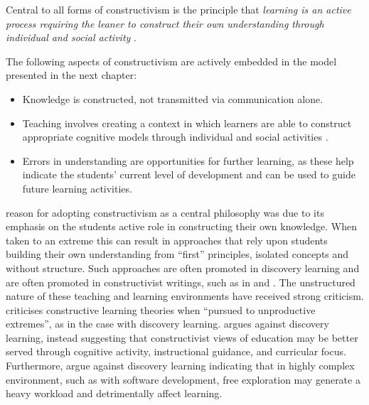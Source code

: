 Central to all forms of constructivism is the principle that \emph{learning is an active process requiring the leaner to construct their own understanding through individual and social activity} \cite{Biggs:1996c,Duffy:1996,Duffy:1992,Glasersfeld:1989,Steffe:1995}. 

%
%

The following aspects of constructivism are actively embedded in the model presented in the next chapter:
\begin{itemize}[noitemsep,nolistsep]
	\item Knowledge is constructed, not transmitted via communication alone.
	\item Teaching involves creating a context in which learners are able to construct appropriate cognitive models through individual and social activities \cite{Cobb:1994}.
	\item Errors in understanding are opportunities for further learning, as these help indicate the students' current level of development and can be used to guide future learning activities.
\end{itemize}

\citet{Biggs:1996c} reason for adopting constructivism as a central philosophy was due to its emphasis on the students active role in constructing their own knowledge. When taken to an extreme this can result in approaches that rely upon students building their own understanding from ``first'' principles, isolated concepts and without structure. Such approaches are often promoted in discovery learning \cite{Bruner:1961} and are often promoted in constructivist writings, such as in \citet{Glasersfeld:1989} and \citet{Duffy:1996}. The unstructured nature of these teaching and learning environments have received strong criticism. \citet{Anderson:1998} criticises constructive learning theories when ``pursued to unproductive extremes'', as in the case with discovery learning. \citet{Mayer:2004} argues against discovery learning, instead suggesting that constructivist views of education may be better served through cognitive activity, instructional guidance, and curricular focus. Furthermore, \citet{Kirschner:2006} argue against discovery learning indicating that in highly complex environment, such as with software development, free exploration may generate a heavy workload and detrimentally affect learning. 

%
%
%

